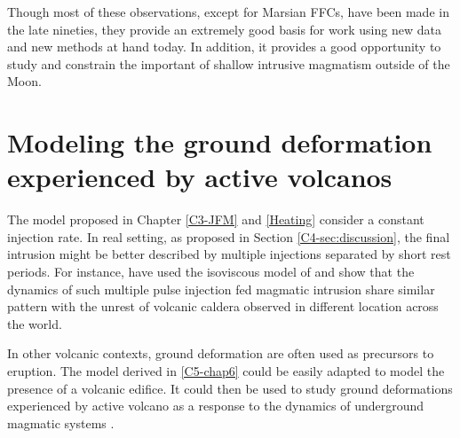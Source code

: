 Though most of these observations,  except for Marsian FFCs, have been
made in  the late nineties, they  provide an extremely good  basis for
work using  new data and  new methods at  hand today. In  addition, it
provides a  good opportunity to  study and constrain the  important of
shallow intrusive magmatism outside of the Moon.

\section{Modeling  the   ground  deformation  experienced   by  active
  volcanos}
\label{sec:caref-descr-tip}

The model proposed in  Chapter \ref{C3-JFM} and \ref{Heating} consider
a constant  injection rate.  In  real setting, as proposed  in Section
\ref{C4-sec:discussion}, the final intrusion might be better described
by multiple injections separated by  short rest periods. For instance,
\citet{Macedonio:2014et}   have   used   the   isoviscous   model   of
\citet{Michaut:2011kg}  and show  that the  dynamics of  such multiple
pulse injection fed magmatic intrusion  share similar pattern with the
unrest of volcanic  caldera observed in different  location across the
world.

In  other volcanic  contexts,  ground deformation  are  often used  as
precursors to eruption.  The model derived in  \ref{C5-chap6} could be
easily adapted to model the presence  of a volcanic edifice.  It could
then  be  used to  study  ground  deformations experienced  by  active
volcano as a response to  the dynamics of underground magmatic systems
\citep{Cayol:2014vo,Pedersen:2004kp,Patane:2006hn,Bonaccorso:2001iw,ChadwickJr:1995cz,Cannavo:2015fk}.




